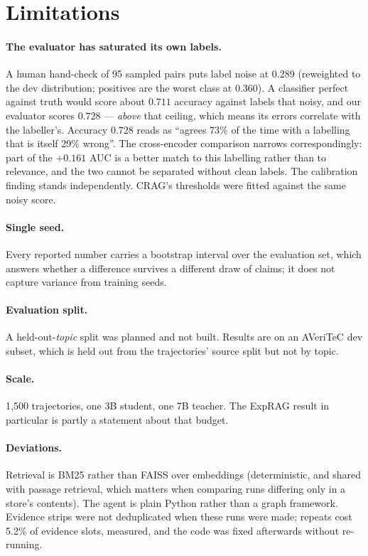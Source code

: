 \documentclass[11pt]{article}
\begin{document}
\section{Limitations}
\label{sec:limitations}

\paragraph{The evaluator has saturated its own labels.} A human hand-check of 95
sampled pairs puts label noise at $0.289$ (reweighted to the dev distribution;
positives are the worst class at $0.360$). A classifier perfect against truth
would score about $0.711$ accuracy against labels that noisy, and our evaluator
scores $0.728$ --- \emph{above} that ceiling, which means its errors correlate
with the labeller's. Accuracy $0.728$ reads as ``agrees 73\% of the time with a
labelling that is itself 29\% wrong''. The cross-encoder comparison narrows
correspondingly: part of the $+0.161$ AUC is a better match to this labelling
rather than to relevance, and the two cannot be separated without clean labels.
The calibration finding stands independently. CRAG's thresholds were fitted
against the same noisy score.

\paragraph{Single seed.} Every reported number carries a bootstrap interval over
the evaluation set, which answers whether a difference survives a different draw
of claims; it does not capture variance from training seeds.

\paragraph{Evaluation split.} A held-out-\emph{topic} split was planned and not
built. Results are on an AVeriTeC dev subset, which is held out from the
trajectories' source split but not by topic.

\paragraph{Scale.} 1{,}500 trajectories, one 3B student, one 7B teacher. The
ExpRAG result in particular is partly a statement about that budget.

\paragraph{Deviations.} Retrieval is BM25 rather than FAISS over embeddings
(deterministic, and shared with passage retrieval, which matters when comparing
runs differing only in a store's contents). The agent is plain Python rather
than a graph framework. Evidence strips were not deduplicated when these runs
were made; repeats cost 5.2\% of evidence slots, measured, and the code was
fixed afterwards without re-running.
\end{document}

